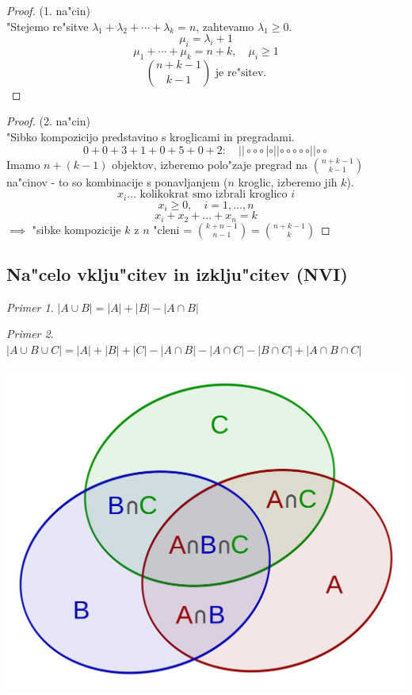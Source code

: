 \documentclass[a4paper,12pt]{article}
\theoremstyle{definition}
\theoremstyle{remark}
\newtheorem*{ex}{Primer}
\begin{document}
\begin{proof}(1. na"cin)\\
	"Stejemo re"sitve $\lambda_1 + \lambda_2 + \cdots + \lambda_k = n$, zahtevamo $\lambda_1 \geqslant 0$.
	\[\mu_i = \lambda_i + 1\]
	\[\mu_1 + \cdots + \mu_k = n + k,\quad \mu_i \geqslant 1\]
	\[\binom{n+k-1}{k-1} \text{ je re"sitev.}\]
\end{proof}
\begin{proof}(2. na"cin)\\
	"Sibko kompozicijo predstavino s kroglicami in pregradami.
	\[0 + 0 + 3 + 1 + 0 + 5 + 0 + 2:\quad ||\circ \circ \circ|\circ||\circ \circ \circ \circ \circ||\circ \circ\]
	Imamo $n + (k - 1)$ objektov, izberemo polo"zaje pregrad na $\binom{n + k - 1}{k - 1}$ na"cinov - to so kombinacije s ponavljanjem ($n$ kroglic, izberemo jih $k$).
	\[x_i \ldots \text{ kolikokrat smo izbrali kroglico }i\]
	\[x_i \geqslant 0, \quad i = 1, ..., n\]
	\[x_i + x_2 + ... + x_n = k\]
	$\implies$ "sibke kompozicije $k$ z $n$ "cleni = $\binom{k + n - 1}{n - 1} = \binom{n + k - 1}{k}$
\end{proof}

\subsection{Na"celo vklju"citev in izklju"citev (NVI)}
\begin{ex}
	$|A \cup B| = |A| + |B| - |A \cap B|$
\end{ex}
\begin{ex}
	$|A \cup B \cup C| = |A| + |B| + |C| - |A \cap B| - |A \cap C| - |B \cap C| + |A \cap B \cap C|$
	\begin{center}
		\includegraphics[scale=0.1]{nvi}
	\end{center}
\end{ex}
\end{document}
